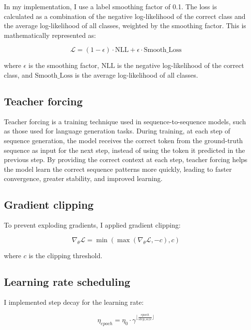 \documentclass{article}
\theoremstyle{plain}
\theoremstyle{definition}
\theoremstyle{remark}
\begin{document}
In my implementation, I use a label smoothing factor of 0.1. The loss is calculated as a combination of the negative log-likelihood of the correct class and the average log-likelihood of all classes, weighted by the smoothing factor. This is mathematically represented as:

\begin{equation}
\mathcal{L} = (1 - \epsilon) \cdot \text{NLL} + \epsilon \cdot \text{Smooth\_Loss}
\end{equation}

where \(\epsilon\) is the smoothing factor, \(\text{NLL}\) is the negative log-likelihood of the correct class, and \(\text{Smooth\_Loss}\) is the average log-likelihood of all classes.
    
\subsection{Teacher forcing} Teacher forcing is a training technique used in sequence-to-sequence models, such as those used for language generation tasks. During training, at each step of sequence generation, the model receives the correct token from the ground-truth sequence as input for the next step, instead of using the token it predicted in the previous step. By providing the correct context at each step, teacher forcing helps the model learn the correct sequence patterns more quickly, leading to faster convergence, greater stability, and improved learning.
    
\subsection{Gradient clipping} To prevent exploding gradients, I applied gradient clipping:
    
\begin{equation}
\nabla_{\theta} \mathcal{L} = \min \left( \max \left( \nabla_{\theta} \mathcal{L}, -c \right), c \right)
\end{equation}

where $c$ is the clipping threshold.
    
\subsection{Learning rate scheduling} I implemented step decay for the learning rate:
    
\begin{equation}
\eta_{epoch} = \eta_{0} \cdot \gamma^{\lfloor \frac{epoch}{step\_size} \rfloor}
\end{equation}
\end{document}
